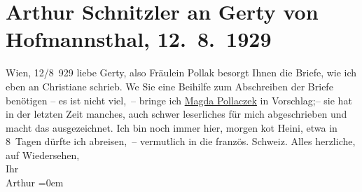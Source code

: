 

         
         \renewcommand{\erwaehntePersonen}{Personen: Gertrude von Hofmannsthal, Magda Pollaczek, Frieda Pollak, Heinrich Schnitzler, Christiane Zimmer}
         \renewcommand{\erwaehnteOrte}{Orte: Bad Aussee, Schweiz, Wien}
         \renewcommand{\erwaehnteWerke}{}
               \section[Arthur Schnitzler an Gerty von Hofmannsthal, 12. 8. 1929]{ Arthur Schnitzler an Gerty von Hofmannsthal, 12. 8. 1929}\nopagebreak{}\rehead{ }\begin{ledgroupsized}[t]{13cm}\normalsize\beginnumbering{} \toendnotes[C]{\smallbreak\pagebreak[2]} 
\pstart
           \raggedleft{}{\pb}Wien, 12/8 929\pend
           \pstart
           liebe Gerty, also Fräulein Pollak besorgt Ihnen die Briefe, wie ich eben an Christiane schrieb. We{\geminationn} Sie eine
               Beihilfe zum Abschreiben der Briefe benötigen – es ist nicht viel, – bringe ich \uline{Magda Pollaczek} in Vorschlag;– sie hat in der letzten Zeit manches, auch schwer leserliches für
               mich abgeschrieben und macht das ausgezeichnet.\pend
           \pstart
           Ich bin noch immer hier, morgen ko{\geminationm}t Heini, etwa in 8 Tagen dürfte ich abreisen, – vermutlich in
               die französ. Schweiz. \pend
           \pstart
           Alles herzliche, auf Wiedersehen,{\\[\baselineskip]}Ihr{\\[\baselineskip]}\spacefill\mbox{Arthur}\pend
           \leftskip=0em{}
         
         \endnumbering{}\end{ledgroupsized}  \newcommand{\dateiname}{L02518}\newcommand{\titel}{Arthur Schnitzler an Gerty von Hofmannsthal, 12. 8. 1929}\newcommand{\editorInnen}{Martin Anton Müller und Gerd-Hermann Susen}
      